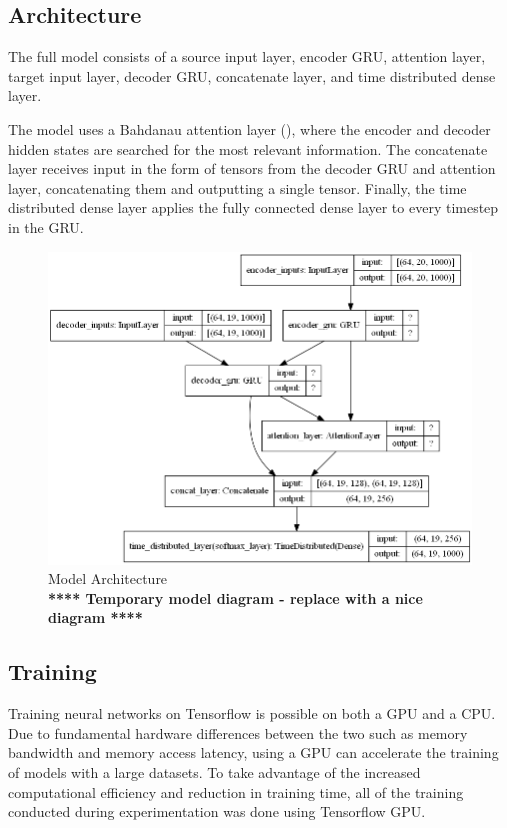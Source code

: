 \subsection{Architecture}

The full model consists of a source input layer, encoder \acrshort{GRU}, attention layer, target input layer, decoder \acrshort{GRU}, concatenate layer, and time distributed dense layer.

The model uses a Bahdanau attention layer (\cite{bahdanau_neural_2016}), where the encoder and decoder hidden states are searched for the most relevant information.
The concatenate layer receives input in the form of tensors from the decoder \acrshort{GRU} and attention layer, concatenating them and outputting a single tensor. Finally, the time distributed dense layer applies the fully connected dense layer to every timestep in the \acrshort{GRU}.



\begin{figure}[ht!]
\centering
\includegraphics[width=1\textwidth]{media/methodology/model_diagram.png}
\captionsetup{justification=centering,font=Large}
\caption[Diagram of the model architecture]{Model Architecture \\ \textbf{**** Temporary model diagram - replace with a nice diagram ****}}
\label{fig:model_diagram}
\end{figure}



\subsection{Training}
Training neural networks on Tensorflow is possible on both a GPU and a CPU. Due to fundamental hardware differences between the two such as memory bandwidth and memory access latency, using a GPU can accelerate the training of models with a large datasets. To take advantage of the increased computational efficiency and reduction in training time, all of the training conducted during experimentation was done using Tensorflow GPU.

